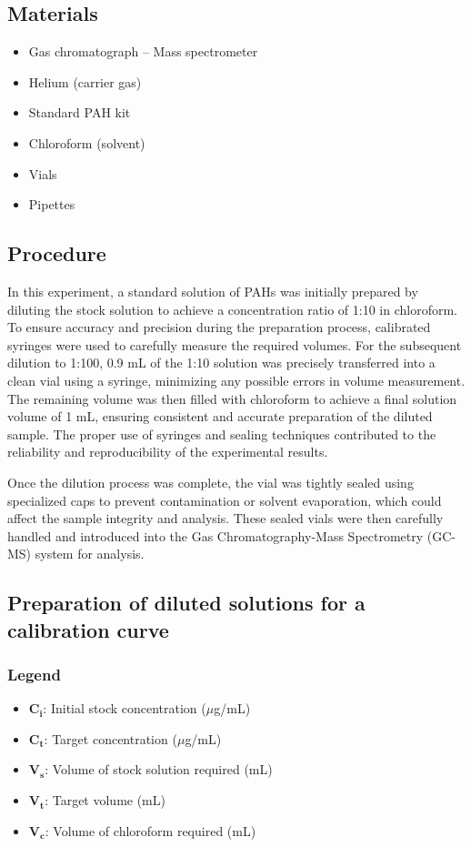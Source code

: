 \documentclass{article}
\begin{document}
\subsection{Materials}
\begin{itemize}
    \item Gas chromatograph -- Mass spectrometer
    \item Helium (carrier gas)
    \item Standard PAH kit
    \item Chloroform (solvent)
    \item Vials
    \item Pipettes
\end{itemize}

\subsection{Procedure}
In this experiment, a standard solution of PAHs was initially prepared by diluting the
stock solution to achieve a concentration ratio of 1:10 in chloroform. To ensure accuracy
and precision during the preparation process, calibrated syringes were used to carefully
measure the required volumes. For the subsequent dilution to 1:100, 0.9 mL of the 1:10
solution was precisely transferred into a clean vial using a syringe, minimizing any
possible errors in volume measurement. The remaining volume was then filled with
chloroform to achieve a final solution volume of 1 mL, ensuring consistent and accurate
preparation of the diluted sample. The proper use of syringes and sealing techniques
contributed to the reliability and reproducibility of the experimental results.

Once the dilution process was complete, the vial was tightly sealed using specialized caps
to prevent contamination or solvent evaporation, which could affect the sample integrity
and analysis. These sealed vials were then carefully handled and introduced into the Gas
Chromatography-Mass Spectrometry (GC-MS) system for analysis.

\subsection{Preparation of diluted solutions for a calibration curve}
\subsubsection{Legend}
\begin{itemize}
    \item $\mathbf{C_i}$: Initial stock concentration ($\mu$g/mL)
    \item $\mathbf{C_t}$: Target concentration ($\mu$g/mL)
    \item $\mathbf{V_s}$: Volume of stock solution required (mL)
    \item $\mathbf{V_t}$: Target volume (mL)
    \item $\mathbf{V_c}$: Volume of chloroform required (mL)
\end{itemize}
\end{document}
